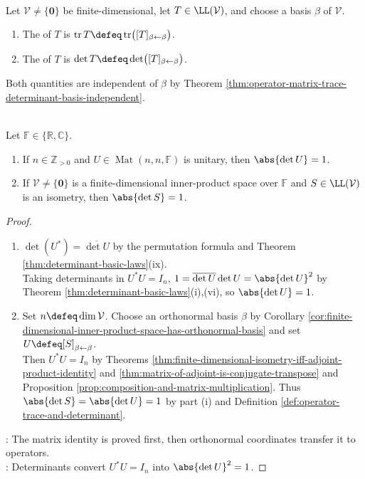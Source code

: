 \begin{definition} \label{def:operator-trace-and-determinant} \\
Let $\mathcal{V}\neq\{\mathbf{0}\}$ be finite-dimensional, let $T\in\LL(\mathcal{V})$, and choose a basis $\beta$ of $\mathcal{V}$.
\begin{enumerate}[label=(\roman*)]
\setlength{\itemsep}{0pt}
\item The  of $T$ is $\operatorname{tr}T\defeq\operatorname{tr}\bigl([T]_{\beta\leftarrow\beta}\bigr)$.
\item The  of $T$ is $\det T\defeq\det\bigl([T]_{\beta\leftarrow\beta}\bigr)$.
\end{enumerate}
Both quantities are independent of $\beta$ by Theorem \ref{thm:operator-matrix-trace-determinant-basis-independent}.
\end{definition}

\begin{proposition} \label{prop:isometry-determinant-absolute-one} \\
Let $\mathbb{F}\in\{\mathbb{R},\mathbb{C}\}$.
\begin{enumerate}[label=(\roman*)]
\setlength{\itemsep}{0pt}
\item If $n\in\mathbb{Z}_{>0}$ and $U\in\operatorname{Mat}(n,n,\mathbb{F})$ is unitary, then $\abs{\det U}=1$.
\item If $\mathcal{V}\neq\{\mathbf{0}\}$ is a finite-dimensional inner-product space over $\mathbb{F}$ and $S\in\LL(\mathcal{V})$ is an isometry, then $\abs{\det S}=1$.
\end{enumerate}
\begin{proof}
\begin{enumerate}[label=(\roman*)]
\setlength{\itemsep}{0pt}
\item $\det(U^*)=\overline{\det U}$ by the permutation formula and Theorem \ref{thm:determinant-basic-laws}(ix).\\
Taking determinants in $U^*U=I_n$, $1=\overline{\det U}\det U=\abs{\det U}^2$ by Theorem \ref{thm:determinant-basic-laws}(i),(vi), so $\abs{\det U}=1$.
\item Set $n\defeq\dim\mathcal{V}$. Choose an orthonormal basis $\beta$ by Corollary \ref{cor:finite-dimensional-inner-product-space-has-orthonormal-basis} and set $U\defeq[S]_{\beta\leftarrow\beta}$.\\
Then $U^*U=I_n$ by Theorems \ref{thm:finite-dimensional-isometry-iff-adjoint-product-identity} and \ref{thm:matrix-of-adjoint-is-conjugate-transpose} and Proposition \ref{prop:composition-and-matrix-multiplication}. Thus $\abs{\det S}=\abs{\det U}=1$ by part (i) and Definition \ref{def:operator-trace-and-determinant}.
\end{enumerate}
: The matrix identity is proved first, then orthonormal coordinates transfer it to operators.\\
: Determinants convert $U^*U=I_n$ into $\abs{\det U}^2=1$.
\end{proof}
\end{proposition}

